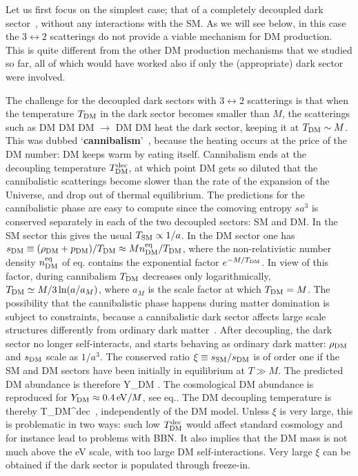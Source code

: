 \medskip

Let us first focus on the simplest case; that of a completely decoupled dark sector~\cite{cannibalism}, without any interactions with the SM. As we will see below, in this case the $3\leftrightarrow 2$ scatterings do not provide a viable mechanism for DM production. This is quite different from the other DM production mechanisms that we studied so far, all of which would have worked also if only the (appropriate) dark sector were involved. 

The challenge for the decoupled dark sectors with $3\leftrightarrow 2$ scatterings is that when the temperature $T_{\rm DM}$ in the dark sector becomes smaller than $M$,
the scatterings such as DM DM DM $\to$ DM DM heat the dark sector, keeping it at $T_{\rm DM}\sim M$.
This was dubbed `{\bf cannibalism}'~\cite{cannibalism}, because the heating occurs at the price of the DM number:
DM keeps warm by eating itself.
Cannibalism ends at the decoupling temperature $T_{\rm DM}^{\rm dec}$, at which point 
DM gets so diluted that the cannibalistic scatterings become slower than the rate of the expansion of the Universe, and drop out of thermal equilibrium.
The predictions for the cannibalistic phase are easy to compute since the comoving entropy $s a^3$  is conserved separately in each of the two decoupled sectors: SM and DM.
In the SM sector this gives the usual $T_{\rm SM}\propto 1/a$.
In the DM sector one has $s_{\rm DM}\equiv (\rho_{\rm DM}+p_{\rm DM})/T_{\rm DM}  \approx M n_{\rm DM}^{\rm eq}/T_{\rm DM}$,
where the non-relativistic number density $n_{\rm DM}^{\rm eq}$ of eq.
contains the exponential factor $e^{-M/T_{\rm DM}}$.
In view of this factor, during cannibalism $T_{\rm DM}$ decreases only logarithmically,
$T_{\rm DM} \simeq M/3\ln(a/a_M)$, where $a_M$ is the scale factor at which $T_{\rm DM}=M$.
The possibility that the cannibalistic phase happens during matter domination is subject to constraints,
because a cannibalistic dark sector affects large scale structures differently from ordinary dark matter~\cite{cannibalism}.
After decoupling, the dark sector no longer self-interacts, and starts behaving as ordinary dark matter: 
$\rho_{\rm DM}$ and $s_{\rm DM}$ scale as $1/a^3$.
The conserved ratio $\xi \equiv s_{\rm SM}/s_{\rm DM}$ is of order one if the SM and DM
sectors have been initially in equilibrium at $T \gg M$.
The predicted DM abundance is therefore
\beq Y_{\rm DM}\equiv {} \approx {}.\eeq
The cosmological DM abundance is reproduced for $Y_{\rm DM} \approx 0.4\,{\rm eV}/M$, see eq..
The DM decoupling temperature is thereby
\beq 
T_{\rm DM}^{\rm dec}\eV\, \xi,
\eeq
independently of the DM model.
Unless $\xi$ is very large, this is problematic in two ways: 
such low $T_{\rm DM}^{\rm dec}$ would affect standard cosmology and for instance lead to problems with BBN. 
It also implies that the DM mass is not much above the eV scale, with too large DM self-interactions.
Very large $\xi$ can be obtained if the dark sector is populated through freeze-in.

